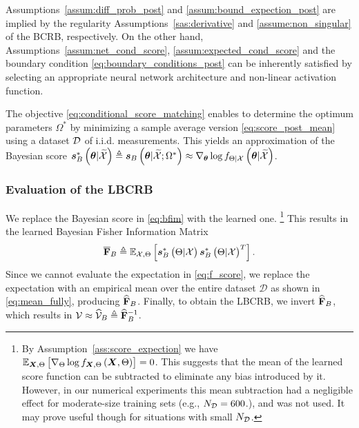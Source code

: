 \begin{remark}\label{remark:condtion_hold_post}
    {Assumptions~\ref{assum:diff_prob_post} and \ref{assum:bound_expection_post} 
are implied by the regularity Assumptions~\ref{sas:derivative} and \ref{assume:non_singular} of the BCRB, %
respectively.}
{On the other hand,}
Assumptions~\ref{assum:net_cond_score}, \ref{assum:expected_cond_score} and the boundary condition \eqref{eq:boundary_conditions_post} can be inherently satisfied by selecting an appropriate neural network architecture and non-linear activation function.
\end{remark}
The objective \eqref{eq:conditional_score_matching} enables 
{ to determine the optimum parameters $\Omega^*$ by minimizing a sample average version \eqref{eq:score_post_mean} using} 
a dataset $\ds$ of i.i.d. measurements.
{ 
This yields} an approximation of the Bayesian score $\postscores{\p}{\xsetr} \triangleq \postscore{\p}{\xsetr;\Omega^*}\approx\nabla_{\p}\log\probt{\p|\xsetr}{\pr|\xset}$. 
\subsubsection{Evaluation of the LBCRB}\label{sec:lbcrb_eval_post}
We replace the Bayesian score in \eqref{eq:bfim} with the learned one.%
\footnote{%
{ By Assumption~\ref{ass:score_expection} we have $\expectation{\nabla_{\pr}\log\probt{{\X},\pr}{{\X},\pr}}{\X,\pr}=0$.  This suggests that the mean of the learned score function can be subtracted to eliminate any bias introduced by it. However, in our numerical experiments this mean subtraction had a negligible effect 
for moderate-size training sets (e.g., $\nds=600$.), and was not used. %
{%
It may prove useful though} for situations with small $\nds$.     }} 
This results  in the learned Bayesian Fisher Information Matrix%
\begin{equation}\label{eq:f_score}
\lbfimb\triangleq\expectation{\postscores{\pr}{\xset}\postscores{\pr}{\xset}^T}{\xset,\pr}.
\end{equation}
Since we cannot evaluate the expectation {in \eqref{eq:f_score}}, we replace the expectation with an empirical mean over the entire dataset $\mathcal{D}$ as shown in \eqref{eq:mean_fully}, %
producing $\lbfimbs$.
Finally, to obtain the LBCRB, we invert $\lbfimbs$, which results in ${\bcrb}\approx\lbcrbbs\triangleq\lbfimbs^{-1}$.


